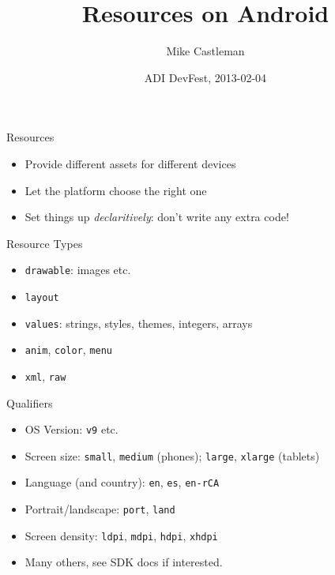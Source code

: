 \documentclass{beamer}
\title[Android Resources]{Resources on Android}
\author{Mike Castleman}
\institute{Meetup}
\date[DevFest 2013]{ADI DevFest, 2013-02-04}
\begin{document}
\begin{frame}
  \titlepage
\end{frame}


\begin{frame}{Resources}
\begin{itemize}
\item Provide different assets for different devices
\item Let the platform choose the right one
\item Set things up \textit{declaritively}: don't write any extra code!
\end{itemize}
\end{frame}

\begin{frame}{Resource Types}
\begin{itemize}
\item \texttt{drawable}: images etc.
\item \texttt{layout}
\item \texttt{values}: strings, styles, themes, integers, arrays
\item \texttt{anim}, \texttt{color}, \texttt{menu}
\item \texttt{xml}, \texttt{raw}
\end{itemize}
\end{frame}

\begin{frame}{Qualifiers}
\begin{itemize}
\item OS Version: \texttt{v9} etc.
\item Screen size: \texttt{small}, \texttt{medium} (phones);
  \texttt{large}, \texttt{xlarge} (tablets)
\item Language (and country): \texttt{en}, \texttt{es},
  \texttt{en-rCA}
\item Portrait/landscape: \texttt{port}, \texttt{land}
\item Screen density: \texttt{ldpi}, \texttt{mdpi}, \texttt{hdpi}, \texttt{xhdpi}
\item Many others, see SDK docs if interested.
\end{itemize}
\end{frame}
\end{document}
